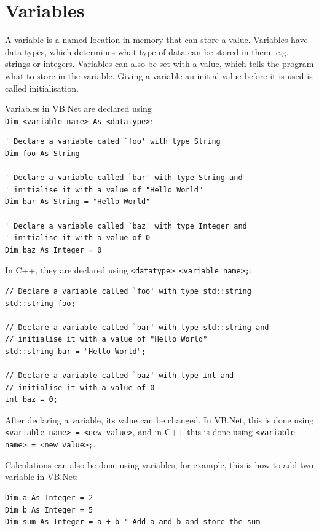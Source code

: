 \section{Variables} \label{variables}
    A variable is a named location in memory that can store a value.
    Variables have data types, which determines what type of data can be stored in them, e.g. strings or integers.
    Variables can also be set with a value, which tells the program what to store in the variable.
    Giving a variable an initial value before it is used is called initialisation.

    Variables in VB.Net are declared using \\ \verb|Dim <variable name> As <datatype>|:

    \begin{verbatim}
' Declare a variable caled `foo' with type String
Dim foo As String

' Declare a variable called `bar' with type String and
' initialise it with a value of "Hello World"
Dim bar As String = "Hello World"

' Declare a variable called `baz' with type Integer and
' initialise it with a value of 0
Dim baz As Integer = 0
    \end{verbatim}

    In C++, they are declared using \verb|<datatype> <variable name>;|:

    \begin{verbatim}
// Declare a variable called `foo' with type std::string
std::string foo;

// Declare a variable called `bar' with type std::string and
// initialise it with a value of "Hello World"
std::string bar = "Hello World";

// Declare a variable called `baz' with type int and
// initialise it with a value of 0
int baz = 0;
    \end{verbatim}

    After declaring a variable, its value can be changed.
    In VB.Net, this is done using \verb|<variable name> = <new value>|, and in C++ this is done using \verb|<variable name> = <new value>;|.
    
    Calculations can also be done using variables, for example, this is how to add two variable in VB.Net:

    \begin{verbatim}
Dim a As Integer = 2
Dim b As Integer = 5
Dim sum As Integer = a + b ' Add a and b and store the sum
    \end{verbatim}

